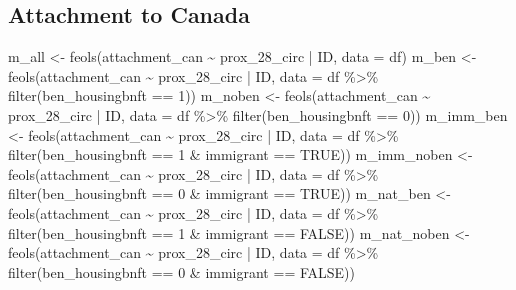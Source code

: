 \documentclass[
  letterpaper,
  DIV=11,
  numbers=noendperiod]{scrartcl}
\newenvironment{Shaded}{\begin{snugshade}}{\end{snugshade}}
\newcommand{\AttributeTok}[1]{\textcolor[rgb]{0.40,0.45,0.13}{#1}}
\newcommand{\ConstantTok}[1]{\textcolor[rgb]{0.56,0.35,0.01}{#1}}
\newcommand{\DecValTok}[1]{\textcolor[rgb]{0.68,0.00,0.00}{#1}}
\newcommand{\FunctionTok}[1]{\textcolor[rgb]{0.28,0.35,0.67}{#1}}
\newcommand{\NormalTok}[1]{\textcolor[rgb]{0.00,0.23,0.31}{#1}}
\newcommand{\OtherTok}[1]{\textcolor[rgb]{0.00,0.23,0.31}{#1}}
\newcommand{\SpecialCharTok}[1]{\textcolor[rgb]{0.37,0.37,0.37}{#1}}
\begin{document}
\hypertarget{attachment-to-canada}{%
\subsection{Attachment to Canada}\label{attachment-to-canada}}

\begin{Shaded}
\begin{Highlighting}[]
\NormalTok{m\_all }\OtherTok{\textless{}{-}} \FunctionTok{feols}\NormalTok{(attachment\_can }\SpecialCharTok{\textasciitilde{}}\NormalTok{ prox\_28\_circ }\SpecialCharTok{|}\NormalTok{ ID, }\AttributeTok{data =}\NormalTok{ df)}
\NormalTok{m\_ben }\OtherTok{\textless{}{-}} \FunctionTok{feols}\NormalTok{(attachment\_can }\SpecialCharTok{\textasciitilde{}}\NormalTok{ prox\_28\_circ }\SpecialCharTok{|}\NormalTok{ ID,}
               \AttributeTok{data =}\NormalTok{ df }\SpecialCharTok{\%\textgreater{}\%} \FunctionTok{filter}\NormalTok{(ben\_housingbnft }\SpecialCharTok{==} \DecValTok{1}\NormalTok{))}
\NormalTok{m\_noben }\OtherTok{\textless{}{-}} \FunctionTok{feols}\NormalTok{(attachment\_can }\SpecialCharTok{\textasciitilde{}}\NormalTok{ prox\_28\_circ }\SpecialCharTok{|}\NormalTok{ ID,}
                 \AttributeTok{data =}\NormalTok{ df }\SpecialCharTok{\%\textgreater{}\%} \FunctionTok{filter}\NormalTok{(ben\_housingbnft }\SpecialCharTok{==} \DecValTok{0}\NormalTok{))}
\NormalTok{m\_imm\_ben }\OtherTok{\textless{}{-}} \FunctionTok{feols}\NormalTok{(attachment\_can }\SpecialCharTok{\textasciitilde{}}\NormalTok{ prox\_28\_circ }\SpecialCharTok{|}\NormalTok{ ID,}
                   \AttributeTok{data =}\NormalTok{ df }\SpecialCharTok{\%\textgreater{}\%} \FunctionTok{filter}\NormalTok{(ben\_housingbnft }\SpecialCharTok{==} \DecValTok{1} \SpecialCharTok{\&}\NormalTok{ immigrant }\SpecialCharTok{==} \ConstantTok{TRUE}\NormalTok{))}
\NormalTok{m\_imm\_noben }\OtherTok{\textless{}{-}} \FunctionTok{feols}\NormalTok{(attachment\_can }\SpecialCharTok{\textasciitilde{}}\NormalTok{ prox\_28\_circ }\SpecialCharTok{|}\NormalTok{ ID,}
                     \AttributeTok{data =}\NormalTok{ df }\SpecialCharTok{\%\textgreater{}\%} \FunctionTok{filter}\NormalTok{(ben\_housingbnft }\SpecialCharTok{==} \DecValTok{0} \SpecialCharTok{\&}\NormalTok{ immigrant }\SpecialCharTok{==} \ConstantTok{TRUE}\NormalTok{))}
\NormalTok{m\_nat\_ben }\OtherTok{\textless{}{-}} \FunctionTok{feols}\NormalTok{(attachment\_can }\SpecialCharTok{\textasciitilde{}}\NormalTok{ prox\_28\_circ }\SpecialCharTok{|}\NormalTok{ ID,}
                   \AttributeTok{data =}\NormalTok{ df }\SpecialCharTok{\%\textgreater{}\%} \FunctionTok{filter}\NormalTok{(ben\_housingbnft }\SpecialCharTok{==} \DecValTok{1} \SpecialCharTok{\&}\NormalTok{ immigrant }\SpecialCharTok{==} \ConstantTok{FALSE}\NormalTok{))}
\NormalTok{m\_nat\_noben }\OtherTok{\textless{}{-}} \FunctionTok{feols}\NormalTok{(attachment\_can }\SpecialCharTok{\textasciitilde{}}\NormalTok{ prox\_28\_circ }\SpecialCharTok{|}\NormalTok{ ID,}
                     \AttributeTok{data =}\NormalTok{ df }\SpecialCharTok{\%\textgreater{}\%} \FunctionTok{filter}\NormalTok{(ben\_housingbnft }\SpecialCharTok{==} \DecValTok{0} \SpecialCharTok{\&}\NormalTok{ immigrant }\SpecialCharTok{==} \ConstantTok{FALSE}\NormalTok{))}


\end{Highlighting}
\end{Shaded}
\end{document}
